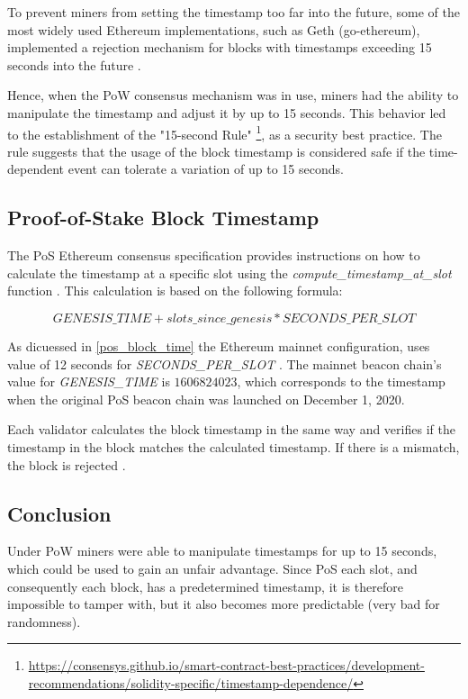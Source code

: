 To prevent miners from setting the timestamp too far into the future, some of
the most widely used Ethereum implementations, such as Geth (go-ethereum),
implemented a rejection mechanism for blocks with timestamps exceeding 15
seconds into the future \cite{go-ethereum-15-sek-limit}.

Hence, when the PoW consensus mechanism was in use, miners had the ability to
manipulate the timestamp and adjust it by up to 15 seconds. This behavior led
to the establishment of the "15-second Rule"
\footnote{\url{https://consensys.github.io/smart-contract-best-practices/development-recommendations/solidity-specific/timestamp-dependence/}},
as a security best practice. The
rule suggests that the usage of the block timestamp is considered
safe if the time-dependent event can tolerate a variation of up to 15 seconds.

\subsection{Proof-of-Stake Block Timestamp}

The PoS Ethereum consensus specification provides instructions on how to
calculate the timestamp at a specific slot using the
\textit{compute\_timestamp\_at\_slot} function \cite{compute-timestamp-at-slot}.
This calculation is based on the following formula:

\begin{equation}
GENESIS\_TIME + slots\_since\_genesis *
SECONDS\_PER\_SLOT
\end{equation}


As dicuessed in \ref{pos_block_time} the Ethereum mainnet configuration, uses
value of 12 seconds for \textit{SECONDS\_PER\_SLOT}
\cite{seconds-per-slot-mainnet} \cite{seconds-per-slot-mainnet-doc}.
The mainnet beacon chain's value for \textit{GENESIS\_TIME} is $1606824023$, which
corresponds to the timestamp when the original PoS beacon chain was launched on
December 1, 2020.

Each validator calculates the block timestamp in the same way and verifies if
the timestamp in the block matches the calculated timestamp. If there is a
mismatch, the block is rejected \cite{process-execution-payload}.

\subsection{Conclusion}

Under PoW miners were able to manipulate timestamps for up to 15 seconds, which
could be used to gain an unfair advantage. Since PoS each slot, and
consequently each block, has a predetermined timestamp, it is
therefore impossible to tamper with, but it also becomes more predictable (very
bad for randomness).

